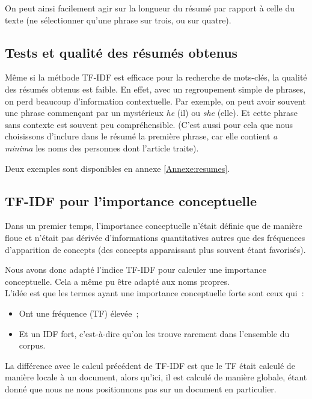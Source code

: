 \documentclass[a4paper, 12pt]{article}
\begin{document}
On peut ainsi facilement agir sur la longueur du résumé par rapport à celle du texte (ne sélectionner qu'une phrase sur trois, ou sur quatre).

\subsection{Tests et qualité des résumés obtenus}

Même si la méthode TF-IDF est efficace pour la recherche de mots-clés, la qualité des résumés obtenus est faible. En effet, avec un regroupement simple de phrases, on perd beaucoup d'information contextuelle. Par exemple, on peut avoir souvent une phrase commençant par un mystérieux \textit{he} (il) ou \textit{she} (elle). Et cette phrase sans contexte est souvent peu compréhensible. (C'est aussi pour cela que nous choisissons d'inclure dans le résumé la première phrase, car elle contient \textit{a minima} les noms des personnes dont l'article traite).

Deux exemples sont disponibles en annexe \ref{Annexe:resumes}.


\subsection{TF-IDF pour l'importance conceptuelle}

Dans un premier temps, l'importance conceptuelle n'était définie que de manière floue et n'était pas dérivée d'informations quantitatives autres que des fréquences d'apparition de concepts (des concepts apparaissant plus souvent étant favorisés).

Nous avons donc adapté l'indice TF-IDF pour calculer une importance conceptuelle. Cela a même pu être adapté aux noms propres.\\

L'idée est que les termes ayant une importance conceptuelle forte sont ceux qui~:
\begin{itemize}
 \item Ont une fréquence (TF) élevée~;
 \item Et un IDF fort, c'est-à-dire qu'on les trouve rarement dans l'ensemble du corpus.
\end{itemize}

La différence avec le calcul précédent de TF-IDF est que le TF était calculé de manière locale à un document, alors qu'ici, il est calculé de manière globale, étant donné que nous ne nous positionnons pas sur un document en particulier.
\end{document}
